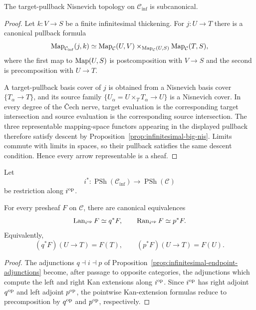 \begin{proposition}
\label{prop:infinitesimal-subcanonical}
The target-pullback Nisnevich topology on $\mathcal C_{\mathrm{inf}}$ is
subcanonical.
\end{proposition}

\begin{proof}
Let $k:V\to S$ be a finite infinitesimal thickening.  For
$j:U\to T$ there is a canonical pullback formula
\[
\operatorname{Map}_{\mathcal C_{\mathrm{inf}}}(j,k)
\simeq
\operatorname{Map}_{\mathcal C}(U,V)
\times_{\operatorname{Map}_{\mathcal C}(U,S)}
\operatorname{Map}_{\mathcal C}(T,S),
\]
where the first map to $\operatorname{Map}(U,S)$ is postcomposition with $V\to S$ and the
second is precomposition with $U\to T$.

A target-pullback basis cover of $j$ is obtained from a Nisnevich basis cover
$\{T_\alpha\to T\}$, and its source family
$\{U_\alpha=U\times_TT_\alpha\to U\}$ is a Nisnevich cover.  In every degree
of the \v{C}ech nerve, target evaluation is the corresponding target
intersection and source evaluation is the corresponding source intersection.
The three representable mapping-space functors appearing in the displayed
pullback therefore satisfy descent by
Proposition~\ref{prop:infinitesimal-big-nis}.  Limits commute with limits in
spaces, so their pullback satisfies the same descent condition.  Hence every
arrow representable is a sheaf.
\end{proof}

Let
\[
    i^*:
    \operatorname{PSh}(\mathcal C_{\mathrm{inf}})
    \longrightarrow
    \operatorname{PSh}(\mathcal C)
\]
be restriction along $i^{\mathrm{op}}$.

\begin{proposition}
\label{prop:infinitesimal-kan-formulas}
For every presheaf $F$ on $\mathcal C$, there are canonical equivalences
\[
    \operatorname{Lan}_{i^{\mathrm{op}}}F\simeq q^*F,
    \qquad
    \operatorname{Ran}_{i^{\mathrm{op}}}F\simeq p^*F.
\]
Equivalently,
\[
    (q^*F)(U\to T)=F(T),
    \qquad
    (p^*F)(U\to T)=F(U).
\]
\end{proposition}

\begin{proof}
The adjunctions $q\dashv i\dashv p$ of
Proposition~\ref{prop:infinitesimal-endpoint-adjunctions} become, after
passage to opposite categories, the adjunctions which compute the left and
right Kan extensions along $i^{\mathrm{op}}$.  Since $i^{\mathrm{op}}$ has right adjoint
$q^{\mathrm{op}}$ and left adjoint $p^{\mathrm{op}}$, the pointwise Kan-extension formulas
reduce to precomposition by $q^{\mathrm{op}}$ and $p^{\mathrm{op}}$, respectively.
\end{proof}

